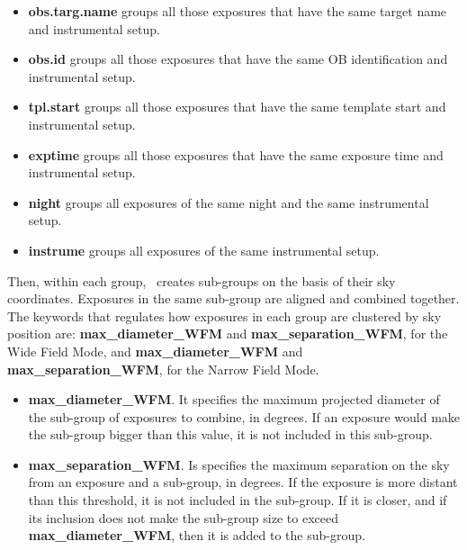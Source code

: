 \begin{itemize}

\item {\bf obs.targ.name} groups all those exposures that have the
  same target name and instrumental setup.

\item {\bf obs.id} groups all those exposures that have the same OB
  identification and instrumental setup.
  
\item {\bf tpl.start} groups all
  those exposures that have the same template start and instrumental
  setup.

\item {\bf exptime} groups all those exposures that have the same
  exposure time and instrumental setup.

\item {\bf night} groups all exposures of the same night and the same
  instrumental setup.

\item {\bf instrume} groups all exposures of the same instrumental
  setup.
\end{itemize}

Then, within each group, \edps\ creates sub-groups on the basis of
their sky coordinates. Exposures in the same sub-group are aligned and
combined together.  The keywords that regulates how exposures in each
group are clustered by sky position are: {\bf max\_diameter\_WFM} and
{\bf max\_separation\_WFM}, for the Wide Field Mode, and {\bf
  max\_diameter\_WFM} and {\bf max\_separation\_WFM}, for the Narrow
Field Mode.

\begin{itemize}

\item {\bf max\_diameter\_WFM}. It specifies the maximum projected
  diameter of the sub-group of exposures to combine, in degrees.  If
  an exposure would make the sub-group bigger than this value, it is
  not included in this sub-group.

\item {\bf max\_separation\_WFM}. Is specifies the maximum separation on
  the sky from an exposure and a sub-group, in degrees. If the
  exposure is more distant than this threshold, it is not included in
  the sub-group. If it is closer, and if its inclusion does not make
  the sub-group size to exceed {\bf max\_diameter\_WFM}, then it is added
  to the sub-group.
\end{itemize}

